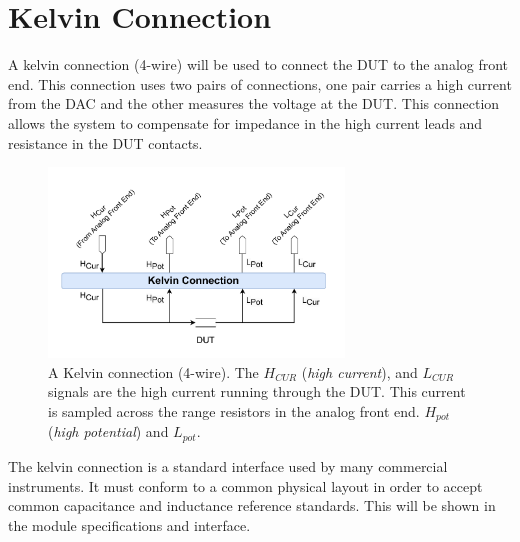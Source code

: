 \section{Kelvin Connection} \label{sec:KelvinConnection}
A kelvin connection (4-wire) will be used to connect the DUT to the analog front end. This connection uses two pairs of connections, one pair carries a high current from the DAC and the other measures the voltage at the DUT. This connection allows the system to compensate for impedance in the high current leads and resistance in the DUT contacts.

\begin{figure}[H]
    \centering
    \includegraphics[clip, trim=18 0 18 0,width=0.70\textwidth]{Sections/6_SystemArchitecture/Figures/Kelvin Connection.pdf}
    \caption{A Kelvin connection (4-wire). The $H_{CUR}$ (\textit{high current}), and $L_{CUR}$ signals are the high current running through the DUT. This current is sampled across the range resistors in the analog front end. $H_{pot}$ (\textit{high potential}) and $L_{pot}$.}
    \label{fig_6_2_KelvinConnection}
\end{figure}

The kelvin connection is a standard interface used by many commercial instruments. It must conform to a common physical layout in order to accept common capacitance and inductance reference standards. This will be shown in the module specifications and interface.


